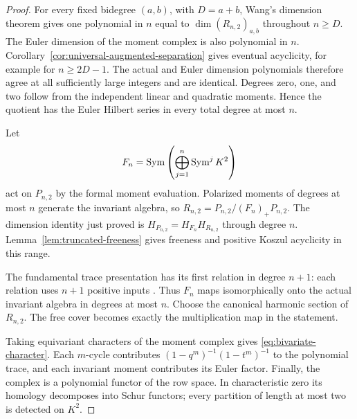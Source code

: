 \begin{proof}
For every fixed bidegree $(a,b)$, with $D=a+b$, Wang's dimension
theorem \cite[Theorem~5.1]{Wang2026Polynomiality} gives one polynomial in $n$
equal to $\dim(R_{n,2})_{a,b}$ throughout $n\ge D$.
The Euler dimension of the moment complex is also polynomial in
$n$. Corollary~\ref{cor:universal-augmented-separation} gives eventual
acyclicity, for example for $n\ge2D-1$.
The actual and Euler dimension polynomials therefore agree at all
sufficiently large integers and are identical. Degrees zero,
one, and two follow from the independent linear and quadratic
moments. Hence the quotient has the Euler Hilbert series in every
total degree at most $n$.

Let
\[
 F_n=\operatorname{Sym}\left(\bigoplus_{j=1}^n\operatorname{Sym}^jK^2\right)
\]
act on $P_{n,2}$ by the formal moment evaluation. Polarized moments of
degrees at most $n$ generate the invariant algebra, so
$R_{n,2}=P_{n,2}/(F_n)_+P_{n,2}$.
The dimension
identity just proved is
$H_{P_{n,2}}=H_{F_n}H_{R_{n,2}}$ through degree $n$.
Lemma~\ref{lem:truncated-freeness} gives freeness and positive
Koszul acyclicity in this range.

The fundamental trace presentation has its first relation in
degree $n+1$: each relation uses $n+1$ positive inputs
\cite{Domokos2017}. Thus $F_n$ maps isomorphically
onto the actual invariant algebra in degrees at most $n$.
Choose the canonical harmonic section of $R_{n,2}$. The free
cover becomes exactly the multiplication map in the statement.

Taking equivariant characters of the moment complex gives
\eqref{eq:bivariate-character}. Each $m$-cycle contributes
$(1-q^m)^{-1}(1-t^m)^{-1}$ to the polynomial trace, and each
invariant moment contributes its Euler factor. Finally, the
complex is a polynomial functor of the row space. In
characteristic zero its homology decomposes into Schur functors;
every partition of length at most two is detected on $K^2$.
\end{proof}



